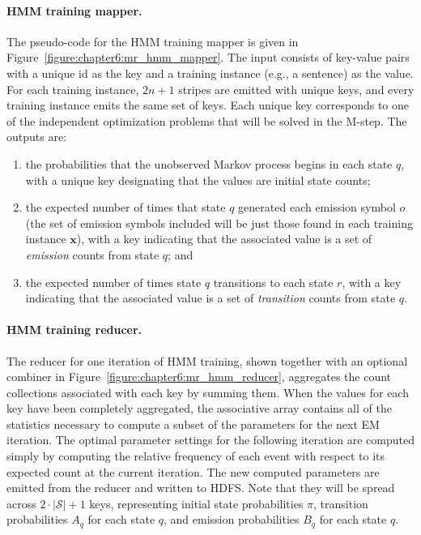 \paragraph{\textbf{HMM training mapper.}}
The pseudo-code for the HMM training mapper is given in
Figure~\ref{figure:chapter6:mr_hmm_mapper}.  The input consists of
key-value pairs with a unique id as the key and a training instance
(e.g., a sentence) as the value.  For each training instance, $2n+1$
stripes are emitted with unique keys, and every training instance
emits the same set of keys.  Each unique key corresponds to one of the
independent optimization problems that will be solved in the M-step.
The outputs are:

\begin{enumerate}
\item the probabilities that the unobserved Markov process begins in
  each state $q$, with a unique key designating that the values are
  initial state counts;

\item the expected number of times that state $q$ generated each
  emission symbol $o$ (the set of emission symbols included will be
  just those found in each training instance $\textbf{x}$), with a key
  indicating that the associated value is a set of \emph{emission}
  counts from state $q$; and

\item the expected number of times state $q$ transitions to each state
  $r$, with a key indicating that the associated value is a set of
  \emph{transition} counts from state $q$.

\end{enumerate}

\paragraph{\textbf{HMM training reducer.}}
The reducer for one iteration of HMM training, shown together with an
optional combiner in Figure~\ref{figure:chapter6:mr_hmm_reducer},
aggregates the count collections associated with each key by summing
them.  When the values for each key have been completely aggregated,
the associative array contains all of the statistics necessary to
compute a subset of the parameters for the next EM iteration.  The
optimal parameter settings for the following iteration are computed
simply by computing the relative frequency of each event with respect
to its expected count at the current iteration.  The new computed
parameters are emitted from the reducer and written to HDFS.  Note
that they will be spread across $2\cdot | \mathcal{S} |+1$ keys,
representing initial state probabilities $\pi$, transition
probabilities $A_q$ for each state $q$, and emission probabilities
$B_q$ for each state $q$.


